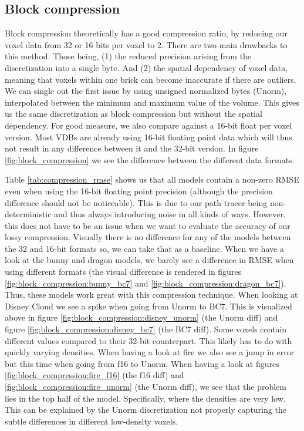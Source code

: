 \subsection{Block compression} \label{results:block_compression}
Block compression theoretically has a good compression ratio, by reducing our voxel data from 32 or 16 bits per voxel to 2. There are two main drawbacks to this method. Those being, (1) the reduced precision arising from the discretization into a single byte. And (2) the spatial dependency of voxel data, meaning that voxels within one brick can become inaccurate if there are outliers. We can single out the first issue by using unsigned normalized bytes (Unorm), interpolated between the minimum and maximum value of the volume. This gives us the same discretization as block compression but without the spatial dependency. For good measure, we also compare against a 16-bit float per voxel version. Most VDBs are already using 16-bit floating point data which will thus not result in any difference between it and the 32-bit version. In figure \ref{fig:block_compression} we see the difference between the different data formats. 

Table \ref{tab:compression_rmse} shows us that all models contain a non-zero RMSE even when using the 16-bit floating point precision (although the precision difference should not be noticeable). This is due to our path tracer being non-deterministic and thus always introducing noise in all kinds of ways. However, this does not have to be an issue when we want to evaluate the accuracy of our lossy compression. Visually there is no difference for any of the models between the 32 and 16-bit formats so, we can take that as a baseline. When we have a look at the bunny and dragon models, we barely see a difference in RMSE when using different formats (the visual difference is rendered in figures \ref{fig:block_compression:bunny_bc7} and \ref{fig:block_compression:dragon_bc7}). Thus, these models work great with this compression technique. When looking at Disney Cloud we see a spike when going from Unorm to BC7. This is visualized above in figure \ref{fig:block_compression:disney_unorm} (the Unorm diff) and figure \ref{fig:block_compression:disney_bc7} (the BC7 diff). Some voxels contain different values compared to their 32-bit counterpart. This likely has to do with quickly varying densities. When having a look at fire we also see a jump in error but this time when going from f16 to Unorm. When having a look at figures \ref{fig:block_compression:fire_f16} (the f16 diff) and \ref{fig:block_compression:fire_unorm} (the Unorm diff), we see that the problem lies in the top half of the model. Specifically, where the densities are very low. This can be explained by the Unorm discretization not properly capturing the subtle differences in different low-density voxels. 

